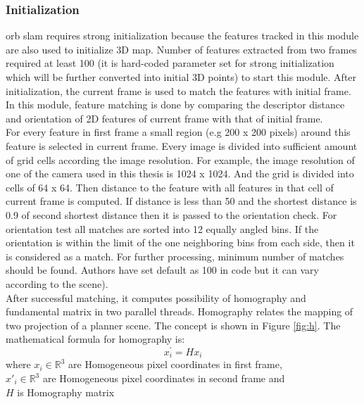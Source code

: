 \subsubsection{Initialization}
\acrshort{orb} \acrshort{slam} requires strong initialization because the features tracked in this module are also used to initialize 3D map. Number of features extracted from two frames required at least 100 (it is hard-coded parameter set for strong initialization which will be further converted into initial 3D points) to start this module. After initialization, the current frame is used to match the features with initial frame. In this module, feature matching is done by comparing the descriptor distance and orientation of 2D features of current frame with that of initial frame.\\
\linebreak
For every feature in first frame a small region (e.g 200 x 200 pixels) around this feature is selected in current frame. Every image is divided into sufficient amount of grid cells according the image resolution. For example, the image resolution of one of the camera used in this thesis is 1024 x 1024. And the grid is divided into cells of 64 x 64. Then distance to the feature with all features in that cell of current frame is computed. If distance is less than 50 and the shortest distance is 0.9 of second shortest distance then it is passed to the orientation check. For orientation test all matches are sorted into 12 equally angled bins. If the orientation is within the limit of the one neighboring bins from each side, then it is considered as a match. For further processing, minimum number of matches should be found. Authors have set default as 100 in code but it can vary according to the scene). \\
\linebreak
After successful matching, it computes possibility of homography and fundamental matrix in two parallel threads. Homography relates the mapping of two projection of a planner scene. The concept is shown in Figure \ref{fig:h}. The mathematical formula for homography is:
\begin{equation*}
    x^{'}_{i} = Hx_{i}    
\end{equation*}    
    where $ x_{i} \in  \mathbb{R}^{3} $ are Homogeneous pixel coordinates in first frame,\\
          $ x{'}_{i} \in  \mathbb{R}^{3} $ are Homogeneous pixel coordinates in second frame and \\ 
          $ H $ is Homography matrix \\
